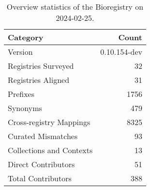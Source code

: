 \begin{table}
\caption{Overview statistics of the Bioregistry on 2024-02-25.}
\label{tab:bioregistry-summary}
\begin{tabular}{lr}
\toprule
Category & Count \\
\midrule
Version & 0.10.154-dev \\
Registries Surveyed & 32 \\
Registries Aligned & 31 \\
Prefixes & 1756 \\
Synonyms & 479 \\
Cross-registry Mappings & 8325 \\
Curated Mismatches & 93 \\
Collections and Contexts & 13 \\
Direct Contributors & 51 \\
Total Contributors & 388 \\
\bottomrule
\end{tabular}
\end{table}
